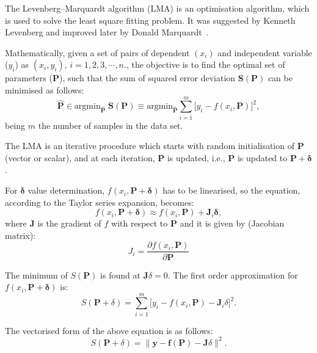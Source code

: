 The Levenberg--Marquardt algorithm (LMA) is an optimisation algorithm, which is used to solve the least square fitting problem. It was suggested by Kenneth Levenberg and improved later by Donald Marquardt~\cite{levenberg1944method,marquardt1963algorithm}.

Mathematically, given a set of pairs of dependent $(x_i)$ and independent variable ($y_i$)  as $(x_i,y_i)$, $i=1, 2, 3, \cdots, n $., the objective is to find the optimal set of parameters ($\mathbf{P}$), such that the sum of squared error deviation $\mathbf{S(P)}$ can be minimised as follows:
\begin{equation}
\mathbf{\hat{P}} \in \text{argmin}_{\mathbf{\hat{P}}} \; \mathbf{S(P)} \equiv \text{argmin}_{\mathbf{\hat{P}}} \sum_{i = 1}^{m}  \Big [y_i-f(x_i, \mathbf{P})\Big]^2,
\end{equation}
being $m$ the number of samples in the data set. 

The LMA is an iterative procedure which starts with random initialisation of $\mathbf{P}$ (vector or scalar), and at each iteration, $\mathbf{P}$ is updated, i.e., $\mathbf{P}$ is updated to $\mathbf{P} + \mathbf{\delta}$. 

For $\mathbf{\delta}$ value determination, $f(x_i,\mathbf{P} + \mathbf{\delta})$ has to be linearised, so the equation, according to the Taylor series expansion, becomes:
\begin{equation}
f(x_i,\mathbf{P} + \mathbf{\delta}) \approx f(x_i,\mathbf{P})+\mathbf{J}_i\mathbf{\delta}, 
\end{equation}
where $\mathbf{J}$ is the gradient of $f$ with respect to $\mathbf{P}$ and it is given by (Jacobian matrix):
\begin{equation}J_i = \frac{\partial f(x_i,\mathbf{P})}{\partial \mathbf{P}}\end{equation}
 
The minimum of $S(\mathbf{P})$ is found at $\mathbf{J}\delta=0$. The first order approximation for $f(x_i,\mathbf{P} + \mathbf{\delta})$ is:
\begin{equation}
    S(\mathbf{P}+\delta) = \sum_{i=1}^{m}\Big[y_i-f(x_i,\mathbf{P})-\mathbf{J}_i\delta \Big]^2.
\end{equation}

The vectorised form of the above equation is as follows:
\begin{equation}
    S(\mathbf{P}+\delta) = \parallel \mathbf{y}- \mathbf{f(P)} - \mathbf{J}\delta\parallel^2.
\end{equation}

